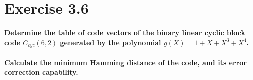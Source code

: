 \documentclass[Main]{subfiles}
\begin{document}
\section*{Exercise 3.6}

\paragraph{Determine the table of code vectors of the binary linear cyclic block code $C_{cyc}(6, 2)$ generated by the polynomial $g(X) = 1 + X + X^3 + X^4$.}

\paragraph{Calculate the minimum Hamming distance of the code, and its error correction
capability.}
\end{document}
